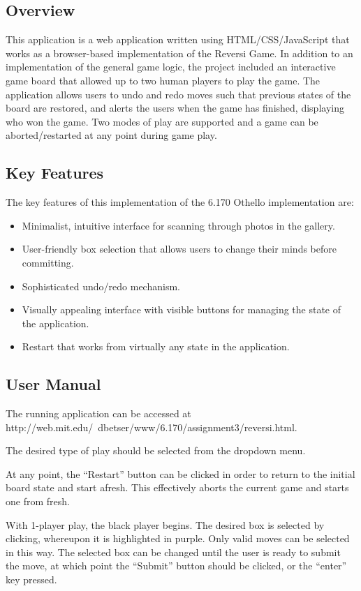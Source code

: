 \documentclass[11pt,letterpaper]{article}
\begin{document}
\subsection{Overview}
This application is a web application written using HTML/CSS/JavaScript that works as a browser-based implementation of the Reversi Game. In addition to an implementation of the general game logic, the project included an interactive game board that allowed up to two human players to play the game. The application allows users to undo and redo moves such that previous states of the board are restored, and alerts the users when the game has finished, displaying who won the game. Two modes of play are supported and a game can be aborted/restarted at any point during game play.

\subsection{Key Features}
The key features of this implementation of the 6.170 Othello implementation are:
\begin{itemize}
\item Minimalist, intuitive interface for scanning through photos in the gallery.
\item User-friendly box selection that allows users to change their minds before committing.
\item Sophisticated undo/redo mechanism.
\item Visually appealing interface with visible buttons for managing the state of the application.
\item Restart that works from virtually any state in the application.
\end{itemize}
\subsection{User Manual}
The running application can be accessed at http://web.mit.edu/~dbetser/www/6.170/assignment3/reversi.html.

The desired type of play should be selected from the dropdown menu.

At any point, the ``Restart'' button can be clicked in order to return to the initial board state and start afresh. This effectively aborts the current game and starts one from fresh.

With 1-player play, the black player begins. The desired box is selected by clicking, whereupon it is highlighted in purple. Only valid moves can be selected in this way. The selected box can be changed until the user is ready to submit the move, at which point the ``Submit'' button should be clicked, or the ``enter'' key pressed.
\end{document}
